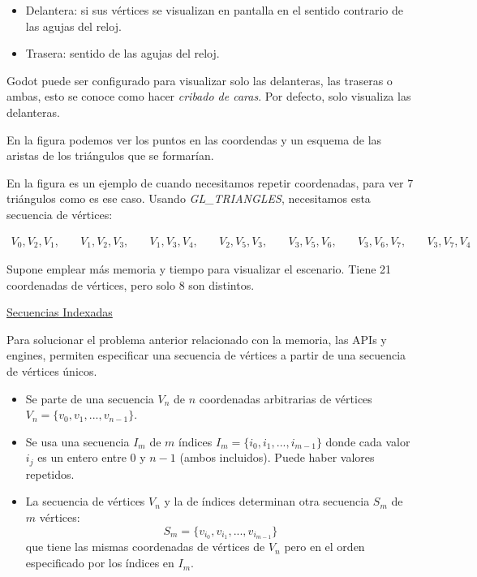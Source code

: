 \documentclass[12pt]{book} %
\providecommand{\tightlist}{%
  \setlength{\itemsep}{0pt}\setlength{\parskip}{0pt}}
\begin{document}
\begin{itemize}
\tightlist
\item
  Delantera: si sus vértices se visualizan en pantalla en el sentido
  contrario de las agujas del reloj.
\item
  Trasera: sentido de las agujas del reloj.
\end{itemize}

Godot puede ser configurado para visualizar solo las delanteras, las
traseras o ambas, esto se conoce como hacer \emph{cribado de caras}. Por
defecto, solo visualiza las delanteras.


En la figura \label{fig:pr1} podemos ver los puntos en las coordendas y
un esquema de las aristas de los triángulos que se formarían.

En la figura \label{fig:pr22} es un ejemplo de cuando necesitamos
repetir coordenadas, para ver 7 triángulos como es ese caso. Usando
\emph{GL\_TRIANGLES}, necesitamos esta secuencia de vértices:

\begin{align*}
V_0, V_2, V_1, & \quad V_1, V_2, V_3, & \quad V_1, V_3, V_4, & \quad V_2, V_5, V_3, & \quad V_3, V_5, V_6, & \quad V_3, V_6, V_7, & \quad V_3, V_7, V_4
\end{align*}

Supone emplear más memoria y tiempo para visualizar el escenario. Tiene
21 coordenadas de vértices, pero solo 8 son distintos.

\underline{Secuencias Indexadas}

Para solucionar el problema anterior relacionado con la memoria, las
APIs y engines, permiten especificar una secuencia de vértices a partir
de una secuencia de vértices únicos.

\begin{itemize}
\item Se parte de una secuencia $V_n$ de $n$ coordenadas arbitrarias de vértices $V_n = \{v_0, v_1, ..., v_{n-1}\}$.
\item Se usa una secuencia $I_m$ de $m$ índices $I_m = \{i_0, i_1, ..., i_{m-1}\}$ donde cada valor $i_j$ es un entero entre $0$ y $n-1$ (ambos incluidos). Puede haber valores repetidos.
\item La secuencia de vértices $V_n$ y la de índices determinan otra secuencia $S_m$ de $m$ vértices:
\[
S_m = \{v_{i_0}, v_{i_1}, ..., v_{i_{m-1}}\}
\]
que tiene las mismas coordenadas de vértices de $V_n$ pero en el orden especificado por los índices en $I_m$.
\end{itemize}
\end{document}
